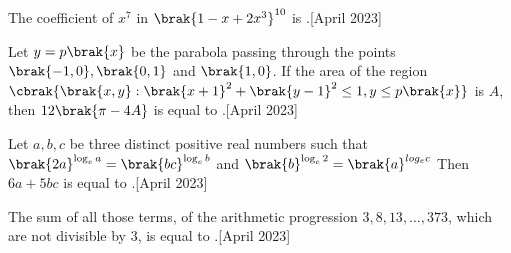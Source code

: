 \item The coefficient of $x^7$ in $\brak{1 - x + 2x^3}^{10}$ is \underline{\hspace{1cm}}.\hfill{[April 2023]}
\item Let $y = p\brak{x}$ be the parabola passing through the points $\brak{-1, 0}, \brak{0, 1}$ and $\brak{1, 0}$. If the area of the region 
$\cbrak{\brak{x, y} : \brak{x+1}^2+\brak{y-1}^2 \leq 1, y \leq p\brak{x}}$ is $A$, then $12\brak{\pi - 4A}$ is equal to \underline{\hspace{1cm}}.\hfill{[April 2023]}
\item Let $a, b, c$ be three distinct positive real numbers such that 
$\brak{2a}^{\log_e a} = \brak{bc}^{\log_e b}$ and $\brak{b}^{\log_e 2} = \brak{a}^{log_e c}$
Then $6a + 5bc$ is equal to \underline{\hspace{1cm}}.\hfill{[April 2023]}
\item The sum of all those terms, of the arithmetic progression $3, 8, 13, \dots, 373$, which are not divisible by $3$, is equal to \underline{\hspace{1cm}}.\hfill{[April 2023]}
